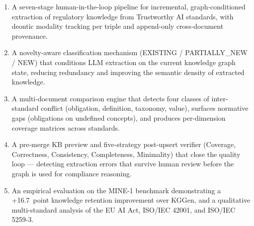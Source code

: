 \begin{enumerate}

    \item A seven-stage human-in-the-loop pipeline for incremental, graph-conditioned extraction of regulatory knowledge from Trustworthy AI standards, with deontic modality tracking per triple and append-only cross-document provenance.

    \item A novelty-aware classification mechanism (EXISTING / PARTIALLY\_NEW / NEW) that conditions LLM extraction on the current knowledge graph state, reducing redundancy and improving the semantic density of extracted knowledge.

    \item A multi-document comparison engine that detects four classes of inter-standard conflict (obligation, definition, taxonomy, value), surfaces normative gaps (obligations on undefined concepts), and produces per-dimension coverage matrices across standards.

    \item A pre-merge KB preview and five-strategy post-upsert verifier (Coverage, Correctness, Consistency, Completeness, Minimality) that close the quality loop — detecting extraction errors that survive human review before the graph is used for compliance reasoning.

    \item An empirical evaluation on the MINE-1 benchmark demonstrating a +16.7~point knowledge retention improvement over KGGen, and a qualitative multi-standard analysis of the EU AI Act, ISO/IEC 42001, and ISO/IEC 5259-3.

\end{enumerate}
